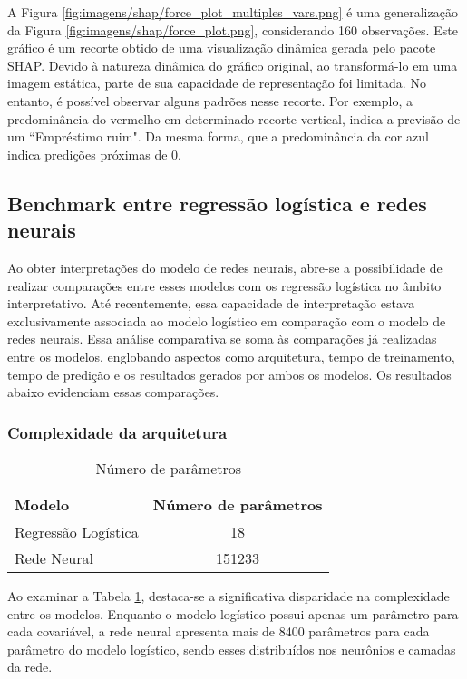 

A Figura \ref{fig:imagens/shap/force_plot_multiples_vars.png} é uma generalização da Figura \ref{fig:imagens/shap/force_plot.png},
considerando 160 observações. Este gráfico é um recorte obtido de uma visualização dinâmica gerada pelo pacote SHAP.
 Devido à natureza dinâmica do gráfico original, ao transformá-lo em uma imagem estática, parte de sua capacidade de 
 representação foi limitada. No entanto, é possível observar alguns padrões nesse recorte. Por exemplo, 
 a predominância do vermelho em determinado recorte vertical, indica a previsão de um ``Empréstimo ruim".
  Da mesma forma, que a predominância da cor azul indica predições próximas de 0.


\subsection{Benchmark entre regressão logística e redes neurais }

Ao obter interpretações do modelo de redes neurais, abre-se a possibilidade de realizar comparações 
entre esses modelos com os regressão logística no âmbito interpretativo. Até recentemente, 
essa capacidade de interpretação estava exclusivamente associada ao modelo logístico em comparação com o modelo de redes neurais.
Essa análise comparativa se soma às comparações já realizadas entre os modelos, englobando aspectos como arquitetura,
tempo de treinamento,
tempo de predição e os resultados gerados por ambos os modelos. Os resultados abaixo evidenciam essas comparações.

\subsubsection{Complexidade da arquitetura}

\begin{table}[H]
  \centering
  \begin{tabular}{lc}
  \hline
  \textbf{Modelo} & \textbf{Número de parâmetros} \\ \hline
  Regressão Logística & 18 \\ 
  Rede Neural & 151233 \\ \hline
  \end{tabular}
  \caption{Número de parâmetros}
  \label{table:model_parameters}
\end{table}

Ao examinar a Tabela \ref{table:model_parameters}, destaca-se a significativa disparidade na
complexidade entre os modelos. Enquanto o modelo logístico possui apenas um parâmetro para cada covariável,
a rede neural apresenta mais de 8400 parâmetros para cada parâmetro do modelo logístico,  
sendo esses distribuídos nos neurônios e camadas da rede.

